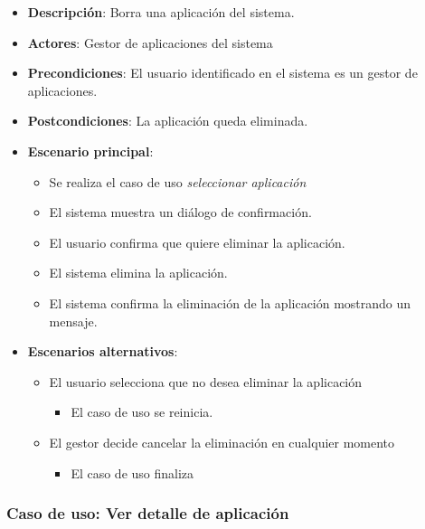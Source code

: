 \documentclass[12pt,a4paperpaper,]{report}
\providecommand{\tightlist}{%
  \setlength{\itemsep}{0pt}\setlength{\parskip}{0pt}}
\begin{document}
\begin{itemize}
\tightlist
\item
  \textbf{Descripción}: Borra una aplicación del sistema.
\item
  \textbf{Actores}: Gestor de aplicaciones del sistema
\item
  \textbf{Precondiciones}: El usuario identificado en el sistema es un
  gestor de aplicaciones.
\item
  \textbf{Postcondiciones}: La aplicación queda eliminada.
\item
  \textbf{Escenario principal}:

  \begin{itemize}
  \tightlist
  \item
    Se realiza el caso de uso \emph{seleccionar aplicación}
  \item
    El sistema muestra un diálogo de confirmación.
  \item
    El usuario confirma que quiere eliminar la aplicación.
  \item
    El sistema elimina la aplicación.
  \item
    El sistema confirma la eliminación de la aplicación mostrando un
    mensaje.
  \end{itemize}
\item
  \textbf{Escenarios alternativos}:

  \begin{itemize}
  \tightlist
  \item
    El usuario selecciona que no desea eliminar la aplicación

    \begin{itemize}
    \tightlist
    \item
      El caso de uso se reinicia.
    \end{itemize}
  \item
    El gestor decide cancelar la eliminación en cualquier momento

    \begin{itemize}
    \tightlist
    \item
      El caso de uso finaliza
    \end{itemize}
  \end{itemize}
\end{itemize}

\subsubsection{Caso de uso: Ver detalle de
aplicación}\label{caso-de-uso-ver-detalle-de-aplicaciuxf3n}
\end{document}
